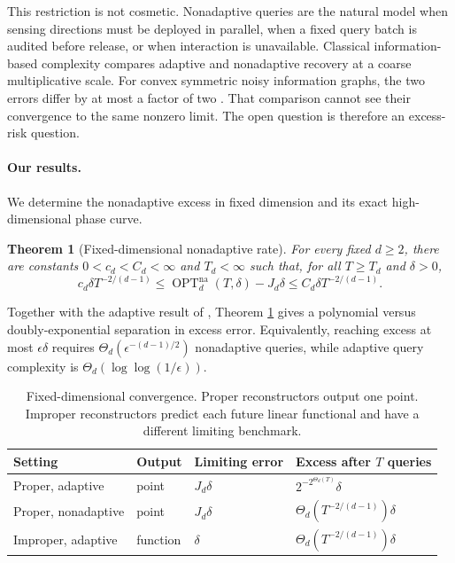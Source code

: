 \documentclass{article}
\newcommand{\OPT}{\operatorname{OPT}}
\newcommand{\na}{\mathrm{na}}
\newtheorem{theorem}{Theorem}
\theoremstyle{definition}
\begin{document}
This restriction is not cosmetic.  Nonadaptive queries are the natural model when sensing directions must be deployed in parallel, when a fixed query batch is audited before release, or when interaction is unavailable.  Classical information-based complexity compares adaptive and nonadaptive recovery at a coarse multiplicative scale.  For convex symmetric noisy information graphs, the two errors differ by at most a factor of two \citep{osipenko2019generalized}.  That comparison cannot see their convergence to the same nonzero limit.  The open question is therefore an excess-risk question.

\paragraph{Our results.}
We determine the nonadaptive excess in fixed dimension and its exact high-dimensional phase curve.

\begin{theorem}[Fixed-dimensional nonadaptive rate]                 \label{thm:fixed}
For every fixed $d\geq2$, there are constants $0<c_d<C_d<\infty$ and $T_d<\infty$ such that, for all $T\geq T_d$ and $\delta>0$, \[ c_d\delta T^{-2/(d-1)} \leq \OPT^{\na}_d(T,\delta)-J_d\delta \leq C_d\delta T^{-2/(d-1)}. \]
\end{theorem}

Together with the adaptive result of \citet{filmus2026optimal}, Theorem \ref{thm:fixed} gives a polynomial versus doubly-exponential separation in excess error.  Equivalently, reaching excess at most $\epsilon\delta$ requires $\Theta_d(\epsilon^{-(d-1)/2})$ nonadaptive queries, while adaptive query complexity is $\Theta_d(\log\log(1/\epsilon))$.

\begin{table}[t]
\caption{Fixed-dimensional convergence.  Proper reconstructors output one
point.  Improper reconstructors predict each future linear functional and have a different limiting benchmark.}
\label{tab:comparison}
\centering
\small
\begin{tabular}{llll}
\toprule
Setting & Output & Limiting error & Excess after $T$ queries \\
\midrule
Proper, adaptive & point & $J_d\delta$ & $2^{-2^{\Theta_d(T)}}\delta$ \\
Proper, nonadaptive & point & $J_d\delta$ & $\Theta_d(T^{-2/(d-1)})\delta$ \\
Improper, adaptive & function & $\delta$ & $\Theta_d(T^{-2/(d-1)})\delta$ \\
\bottomrule
\end{tabular}
\end{table}
\end{document}
